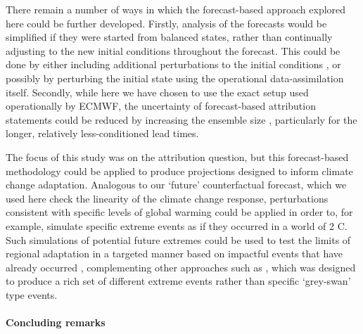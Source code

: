   There remain a number of ways in which the forecast-based approach explored here could be further developed. Firstly, analysis of the forecasts would be simplified if they were started from balanced states, rather than continually adjusting to the new initial conditions throughout the forecast. This could be done by either including additional perturbations to the initial conditions \cite[ie. to the land-surface and atmospheric states,][]{wang_initialized_2021,reed_attribution_2022,wehner_operational_2022}, or possibly by perturbing the initial state using the operational data-assimilation itself. Secondly, while here we have chosen to use the exact setup used operationally by ECMWF, the uncertainty of forecast-based attribution statements could be reduced by increasing the ensemble size \cite[we note that 51 members is a relatively small ensemble in the context of traditional attribution-specific experiments,][]{massey_weatherhome-development_2015,ciavarella_upgrade_2018}, particularly for the longer, relatively less-conditioned lead times.

  The focus of this study was on the attribution question, but this forecast-based methodology could be applied to produce projections designed to inform climate change adaptation. Analogous to our `future' counterfactual forecast, which we used here check the linearity of the climate change response, perturbations consistent with specific levels of global warming could be applied in order to, for example, simulate specific extreme events as if they occurred in a world of 2 \textdegree{}C. Such simulations of potential future extremes could be used to test the limits of regional adaptation in a targeted manner based on impactful events that have already occurred \cite{hazeleger_tales_2015}, complementing other approaches such as \citet{leach_generating_2022}, which was designed to produce a rich set of different extreme events rather than specific `grey-swan' type events.

  \paragraph*{Concluding remarks}\label{ch4:remarks}

